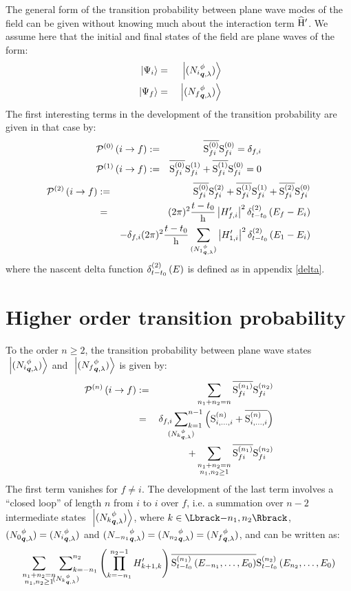 \documentclass[10pt,a4paper,twoside,openany]{book}
\begin{document}
The general form of the transition probability between plane wave modes of the field can be given without knowing much about the interaction term $\Hop'$. We assume here that the initial and final states of the field are plane waves of the form:
\begin{eqnarray*}
\ket{\Psi_i} & = & \ket{\bFQ {N_i} \pt \q \sp} \\
\ket{\Psi_f} & = & \ket{\bFQ {N_f} \pt \q \sp}
\end{eqnarray*}
The first interesting terms in the development of the transition probability are given in that case by:
\begin{eqnarray*}
\TPn i f 0 & \eqdef & \cc{\Smn f i 0} \Smn f i 0 = \delta_{f,i} \\
\TPn i f 1 & \eqdef & \cc{\Smn f i 0} \Smn f i 1 + \cc{\Smn f i 1} \Smn f i 0 = 0
\end{eqnarray*}
\begin{eqnarray*}
\TPn i f 2 & \eqdef & \cc{\Smn f i 0} \Smn f i 2 + \cc{\Smn f i 1} \Smn f i 1 + \cc{\Smn f i 2} \Smn f i 0 \\
& = & ( 2 \pi )^2 \frac{t - t_0} \h \left| H'_{f,i} \right|^2 \deltaE2{E_f - E_i} \\
&& -\delta_{f,i} ( 2 \pi )^2 \frac{t - t_0} \h \sum_{\bFQ {N_1} \pt \q \sp} \left| H'_{1,i} \right|^2 \deltaE2{E_1 - E_i}
\end{eqnarray*}
where the nascent delta function $\deltaE2{E}$ is defined as in appendix \ref{delta}.

\section{Higher order transition probability}

To the order $n \geq 2$, the transition probability between plane wave states $\ket{\bFQ {N_i} \pt \q \sp}$ and $\ket{\bFQ {N_f} \pt \q \sp}$ is given by:
\begin{eqnarray*}
\TPn i f n & \eqdef & \sum_{n_1 + n_2 = n} \cc{\Smn f i {n_1}} \Smn f i {n_2} \\
& = & \delta_{f,i} \sideset{}{_{k=1}^{n-1}}\sum_{\bFQ {N_k} \pt \q \sp} \left( \Smp n {i,\dotsc,i} + \cc{\Smp n {i,\dotsc,i}} \right) \\
&& + \sum_{\substack{n_1 + n_2 = n \\ n_1, n_2 \geq 1}} \cc{\Smn f i {n_1}} \Smn f i {n_2}
\end{eqnarray*}
The first term vanishes for $f \neq i$. The development of the last term involves a ``closed loop'' of length $n$ from $i$ to $i$ over $f$, i.e. a summation over $n - 2$ intermediate states $\ket{\bFQ {N_k} \pt \q \sp}$, where $k \in \IntRange{-n_1}{n_2}$, $\bFQ {N_0} \pt \q \sp = \bFQ {N_i} \pt \q \sp$ and $\bFQ {N_{-n_1}} \pt \q \sp = \bFQ {N_{n_2}} \pt \q \sp = \bFQ {N_f} \pt \q \sp$, and can be written as:
\begin{multline*}
\sum_{\substack{n_1 + n_2 = n \\ n_1, n_2 \geq 1}} \sideset{}{_{k=-n_1}^{n_2}}\sum_{\bFQ {N_k} \pt \q \sp} \left( \prod_{k = -n_1}^{n_2 - 1} H'_{k+1,k} \right) \cc{\SmE{n_1}{E_{-n_1}, \dotsc, E_0}} \SmE{n_2}{E_{n_2}, \dotsc, E_0}
\end{multline*}
\end{document}
